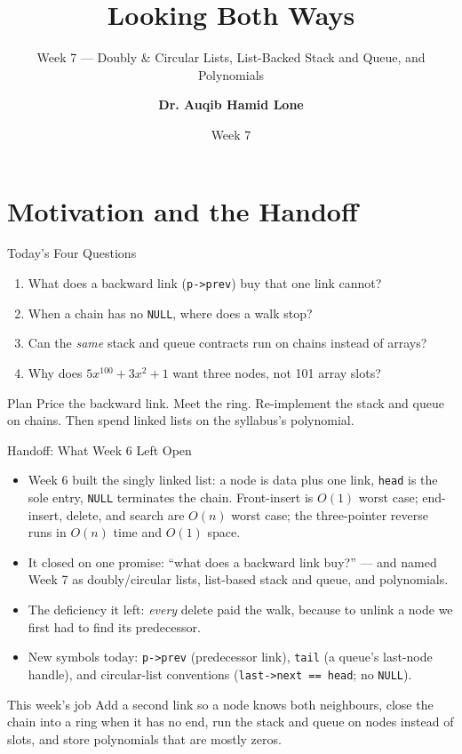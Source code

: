 \documentclass[aspectratio=169]{beamer}
\title{Looking Both Ways}
\subtitle{Week 7 --- Doubly \& Circular Lists, List-Backed Stack and Queue, and Polynomials}
\author[Dr. Auqib Hamid Lone]{\textbf{Dr. Auqib Hamid Lone}}
\institute[GCET Ganderbal]{PCC CS-301: Data Structures\\GCET, Ganderbal}
\date[Week 7]{\small Week 7}
\begin{document}
\frame{\titlepage}

\section{Motivation and the Handoff}

\begin{frame}{Today's Four Questions}
  \begin{enumerate}
    \item What does a backward link (\texttt{p->prev}) buy that one link
      cannot?
    \item When a chain has no \texttt{NULL}, where does a walk stop?
    \item Can the \emph{same} stack and queue contracts run on chains instead
      of arrays?
    \item Why does $5x^{100} + 3x^{2} + 1$ want three nodes, not 101 array
      slots?
  \end{enumerate}
  \vspace{0.2cm}
  \begin{exampleblock}{Plan}
    Price the backward link. Meet the ring. Re-implement the stack and queue
    on chains. Then spend linked lists on the syllabus's polynomial.
  \end{exampleblock}
\end{frame}

\begin{frame}{Handoff: What Week 6 Left Open}
  \begin{itemize}
    \item Week 6 built the singly linked list: a node is data plus one link,
      \texttt{head} is the sole entry, \texttt{NULL} terminates the chain.
      Front-insert is $O(1)$ worst case; end-insert, delete, and search are
      $O(n)$ worst case; the three-pointer reverse runs in $O(n)$ time and
      $O(1)$ space.
    \item It closed on one promise: ``what does a backward link buy?'' --- and
      named Week 7 as doubly/circular lists, list-based stack and queue, and
      polynomials.
    \item The deficiency it left: \emph{every} delete paid the walk, because
      to unlink a node we first had to find its predecessor.
    \item New symbols today: \texttt{p->prev} (predecessor link),
      \texttt{tail} (a queue's last-node handle), and circular-list
      conventions (\texttt{last->next == head}; no \texttt{NULL}).
  \end{itemize}
  \begin{exampleblock}{This week's job}
    Add a second link so a node knows both neighbours, close the chain into a
    ring when it has no end, run the stack and queue on nodes instead of
    slots, and store polynomials that are mostly zeros.
  \end{exampleblock}
\end{frame}
\end{document}

